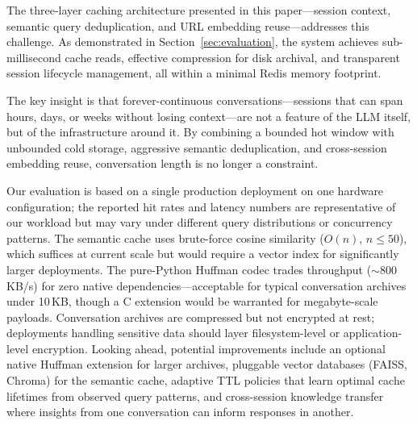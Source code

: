 \documentclass[conference]{IEEEtran}
\begin{document}
The three-layer caching architecture presented in this paper---session context, semantic query deduplication, and URL embedding reuse---addresses this challenge. As demonstrated in Section~\ref{sec:evaluation}, the system achieves sub-millisecond cache reads, effective compression for disk archival, and transparent session lifecycle management, all within a minimal Redis memory footprint.

The key insight is that forever-continuous conversations---sessions that can span hours, days, or weeks without losing context---are not a feature of the LLM itself, but of the infrastructure around it. By combining a bounded hot window with unbounded cold storage, aggressive semantic deduplication, and cross-session embedding reuse, conversation length is no longer a constraint.

Our evaluation is based on a single production deployment on one hardware configuration; the reported hit rates and latency numbers are representative of our workload but may vary under different query distributions or concurrency patterns. The semantic cache uses brute-force cosine similarity ($O(n)$, $n \leq 50$), which suffices at current scale but would require a vector index for significantly larger deployments. The pure-Python Huffman codec trades throughput (${\sim}$800\,KB/s) for zero native dependencies---acceptable for typical conversation archives under 10\,KB, though a C extension would be warranted for megabyte-scale payloads. Conversation archives are compressed but not encrypted at rest; deployments handling sensitive data should layer filesystem-level or application-level encryption. Looking ahead, potential improvements include an optional native Huffman extension for larger archives, pluggable vector databases (FAISS, Chroma) for the semantic cache, adaptive TTL policies that learn optimal cache lifetimes from observed query patterns, and cross-session knowledge transfer where insights from one conversation can inform responses in another.





\end{document}

